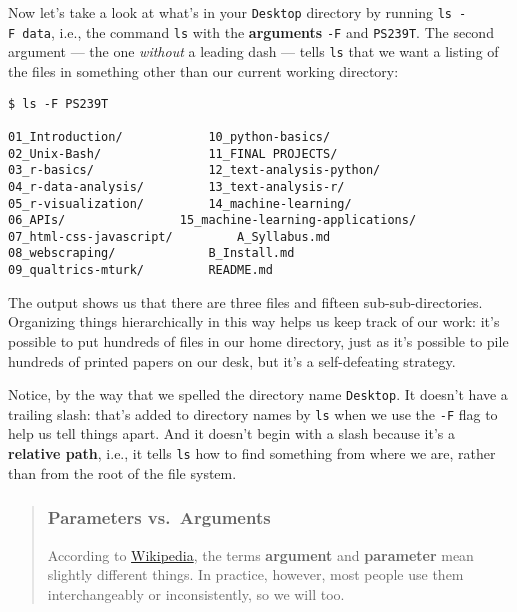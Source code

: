 \documentclass[
]{book}
\begin{document}
Now let's take a look at what's in your \texttt{Desktop} directory by running \texttt{ls\ -F\ data}, i.e., the command \texttt{ls} with the \textbf{arguments} \texttt{-F} and \texttt{PS239T}. The second argument --- the one \emph{without} a leading dash --- tells \texttt{ls} that we want a listing of the files in something other than our current working directory:

\begin{verbatim}
$ ls -F PS239T

01_Introduction/            10_python-basics/
02_Unix-Bash/               11_FINAL PROJECTS/
03_r-basics/                12_text-analysis-python/
04_r-data-analysis/         13_text-analysis-r/
05_r-visualization/         14_machine-learning/
06_APIs/                15_machine-learning-applications/
07_html-css-javascript/         A_Syllabus.md
08_webscraping/             B_Install.md
09_qualtrics-mturk/         README.md
\end{verbatim}

The output shows us that there are three files and fifteen sub-sub-directories. Organizing things hierarchically in this way helps us keep track of our work: it's possible to put hundreds of files in our home directory, just as it's possible to pile hundreds of printed papers on our desk, but it's a self-defeating strategy.

Notice, by the way that we spelled the directory name \texttt{Desktop}. It doesn't have a trailing slash: that's added to directory names by \texttt{ls} when we use the \texttt{-F} flag to help us tell things apart. And it doesn't begin with a slash because it's a \textbf{relative path}, i.e., it tells \texttt{ls} how to find something from where we are, rather than from the root of the file system.

\begin{quote}
\hypertarget{parameters-vs.-arguments}{%
\subsubsection{Parameters vs.~Arguments}\label{parameters-vs.-arguments}}

According to \href{https://en.wikipedia.org/wiki/Parameter_(computer_programming)\#Parameters_and_arguments}{Wikipedia},
the terms \textbf{argument} and \textbf{parameter} mean slightly different things.
In practice, however, most people use them interchangeably or inconsistently,
so we will too.
\end{quote}
\end{document}
